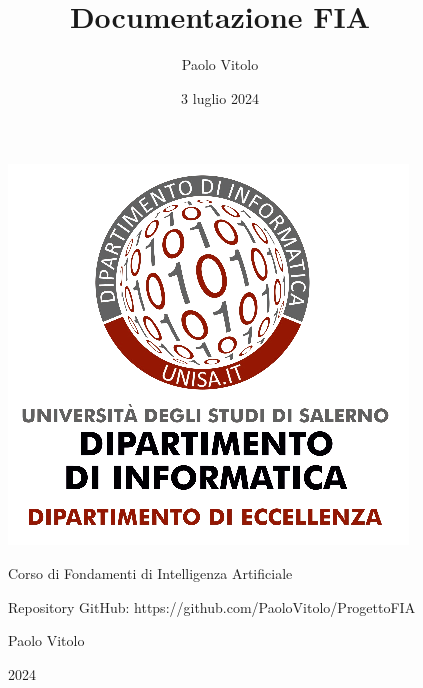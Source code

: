 \documentclass[12 pt]{article}
\title{Documentazione FIA}
\author{Paolo Vitolo}
\date{3 luglio 2024}
\begin{document}
\maketitle
\begin{figure}
    \centering
    \includegraphics[width=0.5\linewidth]{SalernoDInformatica-o.png}
    \label{fig:enter-label}
    \begin{center}
    Corso di Fondamenti di Intelligenza Artificiale
    \end{center}
     Repository GitHub: https://github.com/PaoloVitolo/ProgettoFIA
     \begin{center}
     Paolo Vitolo
     \end{center}
     2024
\end{figure}
\end{document}
